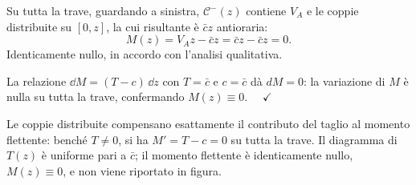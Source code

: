 \begin{esempio}
\begin{svolgimento}
		
		Su tutta la trave, guardando a sinistra,
		$\mathcal{C}^-(z)$ contiene $V_A$ e le coppie
		distribuite su $[0,z]$, la cui risultante è
		$\bar{c}z$ antioraria:
		\[
		M(z) = V_A z - \bar{c}z = \bar{c}z - \bar{c}z = 0.
		\]
		Identicamente nullo, in accordo con l'analisi
		qualitativa.
		
		La relazione $\dd M = (T - c)\,\dd z$ con $T = \bar{c}$
		e $c = \bar{c}$ dà $dM = 0$: la variazione di $M$
		è nulla su tutta la trave, confermando
		$M(z) \equiv 0$. $\quad\checkmark$
		
		\noindent
		Le coppie distribuite compensano esattamente
		il contributo del taglio al momento flettente:
		benché $T \neq 0$, si ha $M' = T - c = 0$ su
		tutta la trave. Il diagramma di $T(z)$ è uniforme
		pari a $\bar{c}$; il momento flettente è
		identicamente nullo, $M(z) \equiv 0$, e non
		viene riportato in figura.
		
	\end{svolgimento}
\end{esempio}


